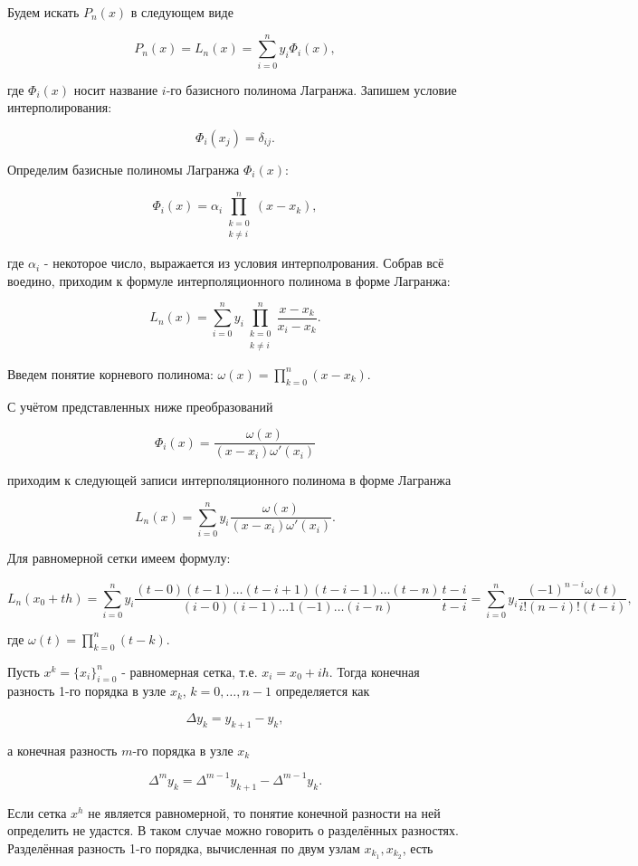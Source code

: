 Будем искать \( P_n(x) \) в следующем виде

$$P_n(x) = L_n(x) = \sum_{i=0}^n y_i \Phi_i(x),$$


где \( \Phi_i(x) \) носит название \( i \)-го базисного полинома Лагранжа. Запишем условие интерполирования:

$$\Phi_i(x_j) = \delta_{ij}.$$

Определим базисные полиномы Лагранжа \( \Phi_i(x) \):

$$\Phi_i(x) = \alpha_i \prod_{\substack{k=0 \\ k \neq i}}^n (x - x_k),$$

где \( \alpha_i \) - некоторое число, выражается из условия интерполрования.
Собрав всё воедино, приходим к формуле интерполяционного полинома в форме Лагранжа:

$$L_n(x) = \sum_{i=0}^n y_i \prod_{\substack{k=0 \\ k \neq i}}^n \frac{x - x_k}{x_i - x_k}.$$

Введем понятие корневого полинома: $\omega(x) = \prod_{k=0}^n (x - x_k).$

С учётом представленных ниже преобразований

$$\Phi_i(x) = \frac{\omega(x)}{(x - x_i)\omega'(x_i)}$$

приходим к следующей записи интерполяционного полинома в форме Лагранжа

$$L_n(x) = \sum_{i=0}^n y_i \frac{\omega(x)}{(x - x_i)\omega'(x_i)}.$$

Для равномерной сетки имеем формулу:

$$L_n(x_0 + th) = \sum_{i=0}^n y_i \frac{(t - 0)(t - 1) \dots (t - i + 1)(t - i - 1) \dots (t - n)}{(i - 0)(i - 1) \dots 1(-1) \dots (i - n)} \frac{t - i}{t - i}= \sum_{i=0}^n y_i \frac{(-1)^{n - i} \omega(t)}{i! (n - i)! (t - i)},$$

где \(\omega(t) = \prod_{k=0}^n (t - k)\).

\dotfill

Пусть \( x^k = \{x_i\}_{i=0}^n \) - равномерная сетка, т.е. \( x_i = x_0 + ih \). Тогда конечная разность 1-го порядка в узле \( x_k \), \( k = 0, \ldots, n-1 \) определяется как

$$\Delta y_k = y_{k+1} - y_k,$$

а конечная разность \( m \)-го порядка в узле \( x_k \)

$$\Delta^m y_k = \Delta^{m-1} y_{k+1} - \Delta^{m-1} y_k.$$

Если сетка \( x^h \) не является равномерной, то понятие конечной разности на ней определить не удастся. В таком случае можно говорить о разделённых разностях. Разделённая разность 1-го порядка, вычисленная по двум узлам \( x_{k_1}, x_{k_2} \), есть

